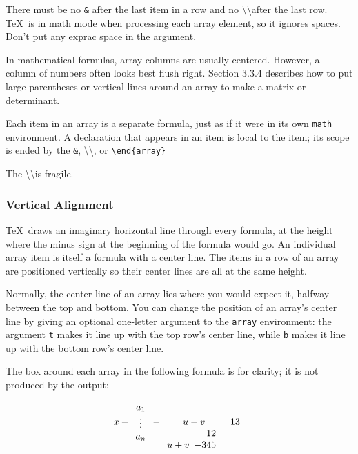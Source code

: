 \documentclass[twocolumn]{book}        %
\begin{document}
There must be no \texttt{\&} after the last item in a row and no \textbackslash \textbackslash after the last row.
\TeX\ is in math mode when processing each array element, so it ignores spaces.
Don't put any exprac space in the argument.

In mathematical formulas, array columns are usually centered. However, a column of numbers often looks best flush right.
Section 3.3.4 describes how to put large parentheses or vertical lines around an array to make a matrix or determinant.

Each item in an array is a separate formula, just as if it were in its own \texttt{math} environment.
A declaration that appears in an item is local to the item;
its scope is ended by the \texttt{\&}, \textbackslash \textbackslash, or \texttt{\textbackslash end\{array\}}

The \textbackslash \textbackslash is fragile.

\subsubsection{Vertical Alignment}

\TeX\ draws an imaginary horizontal line through every formula, at the height where the minus sign at the
beginning of the formula would go. An individual array item is itself a formula with a center line. The items in a 
row of an array are positioned vertically so their center lines are all at the same height.

Normally, the center line of an array lies where you would expect it, halfway between the top and bottom. You 
can change the position of an array's center line by giving an optional one-letter argument to 
the \texttt{array} environment: the argument \texttt{t} makes it line up with the top row's center line, while \texttt{b}
makes it line up with the bottom row's center line.

The box around each array in the following formula is for clarity; it is not produced by the output:

\[ x - \begin{array}{c}
    a_{1} \\ \vdots \\ a_{n}
\end{array}
- \begin{array}[t]{cl}
    u-v     & 13 \\
    u+v     \begin{array}[b]{r}
             12 \\ -345
    \end{array}
\end{array}   \]
\end{document}

